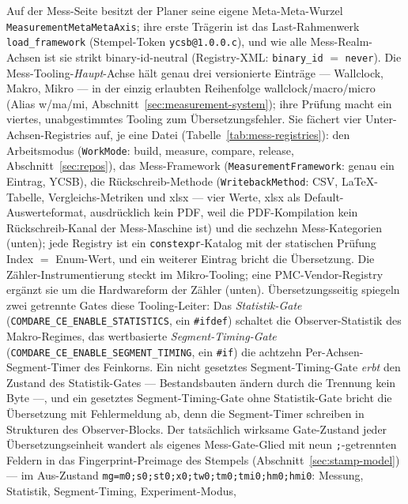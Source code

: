 \begin{nurlang}
Auf der Mess-Seite besitzt der Planer seine eigene Meta-Meta-Wurzel \texttt{MeasurementMetaMetaAxis};
ihre erste Trägerin ist das Last-Rahmenwerk \texttt{load\_framework} (Stempel-Token
\texttt{ycsb@1.0.0.c}), und wie alle Mess-Realm-Achsen ist sie strikt binary-id-neutral (Registry-XML\@:
\texttt{binary\_id} $=$ \texttt{never}). Die Mess-Tooling-\emph{Haupt}-Achse hält genau drei
versionierte Einträge --- Wallclock, Makro, Mikro --- in der einzig erlaubten Reihenfolge
wallclock/macro/micro (Alias w/ma/mi, Abschnitt~\ref{sec:measurement-system}); ihre Prüfung macht ein
viertes, unabgestimmtes Tooling zum Übersetzungsfehler. Sie fächert vier Unter-Achsen-Registries auf, je
eine Datei (Tabelle~\ref{tab:mess-registries}): den Arbeitsmodus (\texttt{WorkMode}: build, measure,
compare, release, Abschnitt~\ref{sec:repos}), das Mess-Framework (\texttt{MeasurementFramework}: genau
ein Eintrag, YCSB), die Rückschreib-Methode (\texttt{WritebackMethod}: CSV, LaTeX-Tabelle,
Vergleichs-Metriken und xlsx --- vier Werte, xlsx als Default-Auswerteformat, ausdrücklich kein PDF, weil
die PDF-Kompilation kein Rückschreib-Kanal der Mess-Maschine ist) und die sechzehn Mess-Kategorien
(unten); jede Registry ist ein \texttt{constexpr}-Katalog mit der statischen Prüfung Index $=$ Enum-Wert, und ein
weiterer Eintrag bricht die Übersetzung. Die Zähler-Instrumentierung steckt im Mikro-Tooling; eine
PMC-Vendor-Registry ergänzt sie um die Hardwareform der Zähler (unten). Übersetzungsseitig spiegeln zwei
getrennte Gates diese Tooling-Leiter: Das \emph{Statistik-Gate}
(\texttt{COMDARE\_\allowbreak{}CE\_\allowbreak{}ENABLE\_\allowbreak{}STATISTICS}, ein \texttt{\#ifdef})
schaltet die Observer-Statistik des Makro-Regimes, das wertbasierte \emph{Segment-Timing-Gate}
(\texttt{COMDARE\_\allowbreak{}CE\_\allowbreak{}ENABLE\_\allowbreak{}SEGMENT\_\allowbreak{}TIMING}, ein
\texttt{\#if}) die achtzehn Per-Achsen-Segment-Timer des Feinkorns. Ein nicht gesetztes
Segment-Timing-Gate \emph{erbt} den Zustand des Statistik-Gates --- Bestandsbauten ändern durch die
Trennung kein Byte ---, und ein gesetztes Segment-Timing-Gate ohne Statistik-Gate bricht die Übersetzung
mit Fehlermeldung ab, denn die Segment-Timer schreiben in Strukturen des Observer-Blocks. Der tatsächlich wirksame
Gate-Zustand jeder Übersetzungseinheit wandert als eigenes Mess-Gate-Glied mit neun \texttt{;}-getrennten
Feldern in das Fingerprint-Preimage des Stempels (Abschnitt~\ref{sec:stamp-model}) --- im Aus-Zustand
\texttt{mg=m0;s0;st0;x0;tw0;tm0;tmi0;hm0;hmi0}: Messung, Statistik, Segment-Timing, Experiment-Modus,

\end{nurlang}
